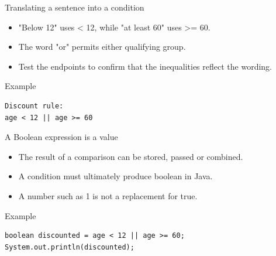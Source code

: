 \documentclass[10pt,aspectratio=169]{beamer}
\begin{document}
\begin{frame}[fragile,t]{Translating a sentence into a condition}
\begin{itemize}
\item "Below 12" uses \textless{} 12, while "at least 60" uses \textgreater{}= 60.
\item The word "or" permits either qualifying group.
\item Test the endpoints to confirm that the inequalities reflect the wording.
\end{itemize}
\vspace{1mm}\begin{block}{Example}
\begin{lstlisting}
Discount rule:
age < 12 || age >= 60
\end{lstlisting}
\end{block}
\end{frame}

\begin{frame}[fragile,t]{A Boolean expression is a value}
\begin{itemize}
\item The result of a comparison can be stored, passed or combined.
\item A condition must ultimately produce boolean in Java.
\item A number such as 1 is not a replacement for true.
\end{itemize}
\vspace{1mm}\begin{block}{Example}
\begin{lstlisting}
boolean discounted = age < 12 || age >= 60;
System.out.println(discounted);
\end{lstlisting}
\end{block}
\end{frame}
\end{document}
